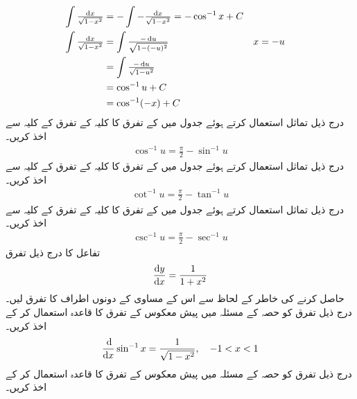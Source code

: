 \begin{align*}
\int\tfrac{\dif x}{\sqrt{1-x^2}}&=-\int-\tfrac{\dif x}{\sqrt{1-x^2}}=-\cos^{-1}x+C\\
\int\tfrac{\dif x}{\sqrt{1-x^2}}&=\int\tfrac{-\dif u}{\sqrt{1-(-u)^2}}&&x=-u\\
&=\int\tfrac{-\dif u}{\sqrt{1-u^2}}\\
&=\cos^{-1}u+C\\
&=\cos^{-1}(-x)+C
\end{align*}
درج ذیل تماثل استعمال کرتے ہوئے    جدول  میں   کے تفرق  کا کلیہ     کے تفرق کے کلیہ سے اخذ کریں۔
\begin{align*}
\cos^{-1}u=\frac{\pi}{2}-\sin^{-1}u
\end{align*}
درج ذیل تماثل استعمال کرتے ہوئے   جدول   میں   کے تفرق  کا کلیہ     کے تفرق کے کلیہ سے اخذ کریں۔
\begin{align*}
\cot^{-1}u=\frac{\pi}{2}-\tan^{-1}u
\end{align*}
درج ذیل تماثل استعمال کرتے ہوئے  جدول  میں   کے تفرق  کا کلیہ     کے تفرق کے کلیہ سے اخذ کریں۔
\begin{align*}
\csc^{-1}u=\frac{\pi}{2}-\sec^{-1}u
\end{align*}
تفاعل  کا  درج ذیل تفرق
\begin{align*}
\frac{\dif y}{\dif x}=\frac{1}{1+x^2}
\end{align*} 
حاصل کرنے کی خاطر   کے لحاظ سے اس کے مساوی  کے دونوں اطراف کا تفرق لیں۔
درج ذیل تفرق کو  حصہ   کے مسئلہ  میں پیش معکوس کے تفرق کا قاعدہ استعمال کر کے   اخذ کریں۔
\begin{align*}
\frac{\dif}{\dif x}\sin^{-1}x=\frac{1}{\sqrt{1-x^2}},\quad -1<x<1
\end{align*}
درج ذیل تفرق کو حصہ  کے  مسئلہ   میں پیش  معکوس کے تفرق کا قاعدہ   استعمال کر کے   اخذ کریں۔
